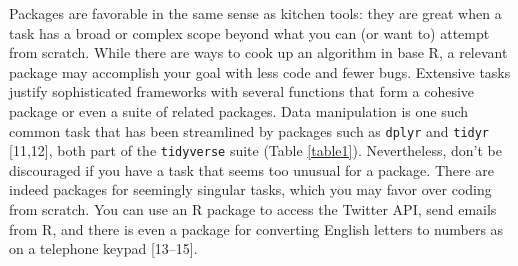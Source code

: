 \documentclass[10pt,letterpaper]{article}
\begin{document}
Packages are favorable in the same sense as kitchen tools: they are
great when a task has a broad or complex scope beyond what you can (or
want to) attempt from scratch. While there are ways to cook up an
algorithm in base R, a relevant package may accomplish your goal with
less code and fewer bugs. Extensive tasks justify sophisticated
frameworks with several functions that form a cohesive package or even a
suite of related packages. Data manipulation is one such common task
that has been streamlined by packages such as \texttt{dplyr} and
\texttt{tidyr} {[}11,12{]}, both part of the \texttt{tidyverse} suite
(Table \ref{table1}). Nevertheless, don't be discouraged if you have a
task that seems too unusual for a package. There are indeed packages for
seemingly singular tasks, which you may favor over coding from scratch.
You can use an R package to access the Twitter API, send emails from R,
and there is even a package for converting English letters to numbers as
on a telephone keypad {[}13--15{]}.

\nocite{kableExtra}
\end{document}
